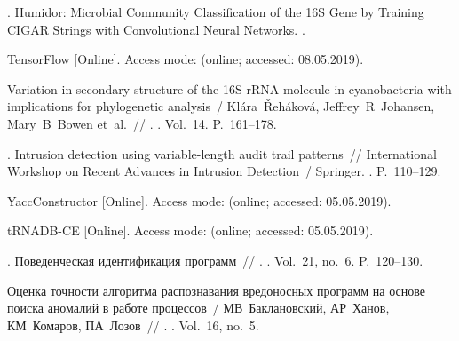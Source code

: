 \begin{thebibliography}{10}
. Humidor: Microbial Community Classification of the
  16S Gene by Training CIGAR Strings with Convolutional Neural Networks.
  \BibDash
{}.

TensorFlow [Online]. \BibDash
\newblock Access mode:  (online; accessed:
  08.05.2019).

Variation in secondary structure of the 16S rRNA molecule in cyanobacteria with
  implications for phylogenetic analysis~/ Kl{\'a}ra~{\v{R}}eh{\'a}kov{\'a},
  Jeffrey~R~Johansen, Mary~B~Bowen et~al.~// . \BibDash
{}. \BibDash
\newblock Vol.~14. \BibDash
\newblock P.~161--178.

. Intrusion detection
  using variable-length audit trail patterns~// International Workshop on
  Recent Advances in Intrusion Detection~/ Springer. \BibDash
{}. \BibDash
\newblock P.~110--129.

YaccConstructor [Online]. \BibDash
\newblock Access mode:  (online;
  accessed: 05.05.2019).

tRNADB-CE [Online]. \BibDash
\newblock Access mode:
   (online;
  accessed: 05.05.2019).

. Поведенческая
  идентификация программ~//
  . \BibDash
{}. \BibDash
\newblock Vol.~21, no.~6. \BibDash
\newblock P.~120--130.

Оценка точности алгоритма распознавания
  вредоносных программ на основе поиска
  аномалий в работе процессов~/
  МВ~Баклановский, АР~Ханов, КМ~Комаров,
  ПА~Лозов~// . \BibDash
{}. \BibDash
\newblock Vol.~16, no.~5.

\end{thebibliography}
